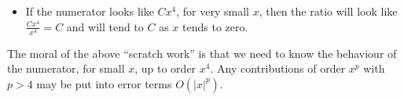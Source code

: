 \begin{eg}
\begin{itemize}
\item If the numerator looks like  $Cx^4$, for very small $x$, then
the ratio will look like $\frac{Cx^4}{x^4}=C$ and will tend to $C$ as
$x$ tends to zero.
\end{itemize}
The moral of the above ``scratch work'' is that we need to know the
behaviour of the numerator, for small $x$, up to order $x^4$. Any
contributions of order $x^p$ with $p>4$ may be put into error
terms $O(|x|^p)$.




\end{eg}
